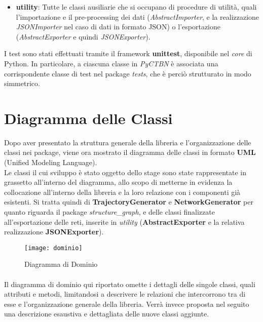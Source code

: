 \begin{itemize}
    \item \textbf{utility}: Tutte le classi ausiliarie che si occupano di procedure di utilità,
      quali l'importazione e il pre-processing dei dati (\textit{AbstractImporter}, e la realizzazione
      \textit{JSONImporter} nel caso di dati in formato JSON) o l'esportazione (\textit{AbstractExporter} e quindi \textit{JSONExporter}).   
  \end{itemize}

  I test sono stati effettuati tramite il framework \textbf{unittest}, disponibile nel \textit{core}
  di Python. In particolare, a ciascuna classe in \textit{PyCTBN} è associata una corrispondente classe di test
  nel package \textit{tests}, che è perciò strutturato in modo simmetrico.

  \section{Diagramma delle Classi}
  Dopo aver presentato la struttura generale della libreria e l'organizzazione delle classi nei package,
  viene ora mostrato il diagramma delle classi in formato \textbf{UML} (Unified Modeling Language).\\
  Le classi il cui sviluppo è stato oggetto dello stage sono state rappresentate in grassetto all'interno del diagramma,
  allo scopo di metterne in evidenza la collocazione all'interno della libreria e la loro relazione con i 
  componenti già esistenti.
  Si tratta quindi di \textbf{TrajectoryGenerator} e \textbf{NetworkGenerator} per quanto riguarda
  il package \textit{structure\_graph}, e delle classi finalizzate all'esportazione delle reti,
  inserite in \textit{utility} (\textbf{AbstractExporter} e la relativa realizzazione \textbf{JSONExporter}).
    
  \begin{figure}[H]
    \texttt{[image: dominio]}
    \centering
    \caption{Diagramma di Dominio}
  \end{figure}

  \paragraph{}
  Il diagramma di dominio qui riportato omette i dettagli delle singole classi, quali attributi e metodi,
  limitandosi a descrivere le relazioni che intercorrono tra di esse e l'organizzazione generale della libreria.
  Verrà invece proposta nel seguito una descrizione esaustiva e dettagliata delle nuove classi aggiunte. 

